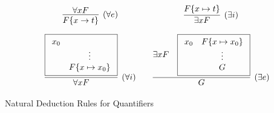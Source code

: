 \begin{table}[hbt]
	\begin{gather*}
	\begin{array}{ccc}
	\infer[(\forall e)]{F\{x\to t\}}{
		\forall x F
	}
	&&
		\infer[(\exists i)]{\exists x F}{
		F\{x\mapsto t \}
	}
	\\[1em]
	\infer[(\forall i)]{\forall x F}{
		\boxed{
			\begin{array}{cc}
				x_0
				\\
				&\vdots
				\\
				&F \{x\mapsto x_0\}
			\end{array}} %
	}
	&&
	\infer[(\exists e)]{G}{
		\exists x F &
		\boxed{
			\begin{array}{cc}
				x_0
				&F \{ x\mapsto x_0 \}
				\\
				&\vdots
				\\
				&G
			\end{array}} %
	}
	\end{array}
	\end{gather*}
	\caption{Natural Deduction Rules for Quantifiers}\label{tab:natural:deduction:quantifiers}
\end{table}